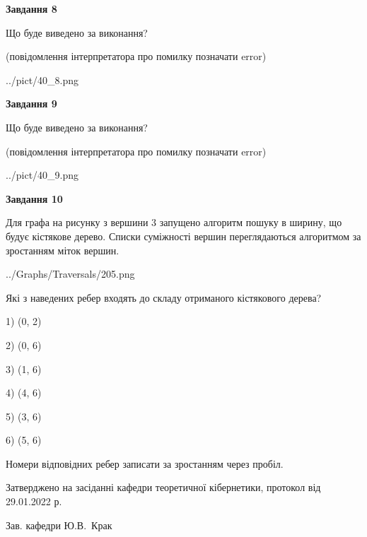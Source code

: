 \documentclass[12pt, ukrainian]{article}
\begin{document}
{\begin {large}
{\begin {center}\textbf{Завдання 8}\end {center}}\par
Що буде виведено за виконання?\par
 (повідомлення інтерпретатора про помилку позначати error)\par
\begin{center}
	{../pict/40_8.png}
\end{center}
\newpage

{\begin {center}\textbf{Завдання 9}\end {center}}\par
Що буде виведено за виконання?\par
 (повідомлення інтерпретатора про помилку позначати error)\par
\begin{center}
	{../pict/40_9.png}
\end{center}
\newpage

{\begin {center}\textbf{Завдання 10}\end {center}}\par
Для графа на рисунку з вершини 3 запущено алгоритм пошуку в ширину, що будує кістякове дерево. Списки суміжності вершин переглядаються алгоритмом за зростанням міток вершин.\par
\begin{center}
	{../Graphs/Traversals/205.png}
\end{center}
\par Які з наведених ребер входять до складу отриманого кістякового дерева?\par
1) (0, 2)\par
2) (0, 6)\par
3) (1, 6)\par
4) (4, 6)\par
5) (3, 6)\par
6) (5, 6)\par
{\vskip 15pt} Номери відповідних ребер записати за зростанням через пробіл.\par
\newpage


\end {large}
}
{\smallskip \begin {small} Затверджено на засіданні кафедри теоретичної кібернетики, протокол  від   29.01.2022 р.\par\smallskip\smallskip
{\parbox {6.5 cm}{Зав. кафедри \dotfill Ю.В.~Крак}} \end{small}}
\end{document}
